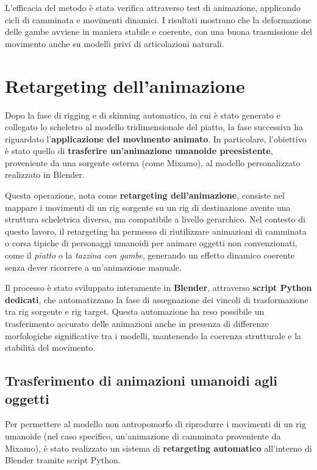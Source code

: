 L'efficacia del metodo è stata verifica attraverso test di animazione, applicando cicli di camminata e movimenti dinamici. I risultati mostrano che la deformazione delle gambe avviene in maniera stabile e coerente, con una buona trasmissione del movimento anche su modelli privi di articolazioni naturali.

\section{Retargeting dell'animazione}

Dopo la fase di rigging e di skinning automatico, in cui è stato generato e collegato lo scheletro al modello tridimensionale del piatto, la fase successiva ha riguardato l'\textbf{applicazione del movimento animato}.
In particolare, l'obiettivo è stato quello di \textbf{trasferire un'animazione umanoide preesistente}, proveniente da una sorgente esterna (come Mixamo), al modello personalizzato realizzato in Blender.

Questa operazione, nota come \textbf{retargeting dell'animazione}, consiste nel mappare i movimenti di un rig sorgente su un rig di destinazione avente una struttura scheletrica diversa, ma compatibile a livello gerarchico.
Nel contesto di questo lavoro, il retargeting ha permesso di riutilizzare animazioni di camminata o corsa tipiche di personaggi umanoidi per animare oggetti non convenzionati, come il \textit{piatto} o la \textit{tazzina con gambe}, generando un effetto dinamico coerente senza dever ricorrere a un'animazione manuale.

Il processo è stato sviluppato interamente in \textbf{Blender}, attraverso \textbf{script Python dedicati}, che automatizzano la fase di assegnazione dei vincoli di trasformazione tra rig sorgente e rig target. Questa automazione ha reso possibile un trasferimento accurato delle animazioni anche in presenza di differenze morfologiche significative tra i modelli, mantenendo la coerenza strutturale e la stabilità del movimento.

\subsection{Trasferimento di animazioni umanoidi agli oggetti}

Per permettere al modello non antropomorfo di riprodurre i movimenti di un rig umanoide (nel caso specifico, un'animazione di camminata proveniente da Mixamo), è stato realizzato un sistema di \textbf{retargeting automatico} all'interno di Blender tramite script Python.

